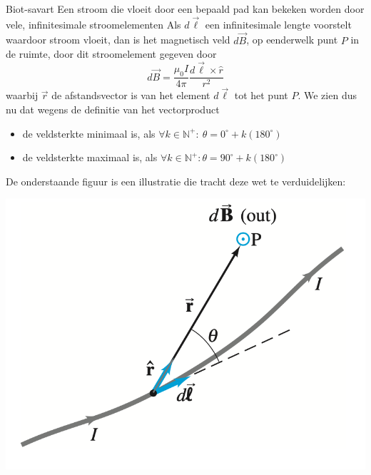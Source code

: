\begin{lem}{Biot-savart}
    Een stroom die vloeit door een bepaald pad kan bekeken worden door vele, infinitesimale
    stroomelementen
    Als $d\Vec{\ell}$ een infinitesimale lengte voorstelt waardoor stroom
    vloeit, dan is het magnetisch veld $d\Vec{B}$, op eenderwelk punt $P$ in de ruimte, door
    dit stroomelement gegeven door
    \begin{equation*}
        d\Vec{B} = \dfrac{\mu_{0}I}{4\pi}\dfrac{d\Vec{\ell} \times \hat{r}}{r^2}
    \end{equation*}
    waarbij $\Vec{r}$ de afstandsvector is van het element $d\Vec{\ell}$ tot het punt $P$. 
    We zien dus nu dat wegens de definitie van het vectorproduct
    \begin{itemize}
        \item de veldsterkte minimaal is, als $\forall k \in \mathbb{N}^{+}: \ \theta = 0^{\circ} + k(180^{\circ})$
        \item de veldsterkte maximaal is, als $\forall k \in \mathbb{N}^{+}: \theta = 90^{\circ} + k(180^{\circ})$
    \end{itemize} 
    De onderstaande figuur is een illustratie die tracht deze wet te verduidelijken:
    \begin{center}
        \includegraphics[scale = 0.4]{Images/Magnetisme/BiotSavart.png}

\end{center}
\end{lem}
